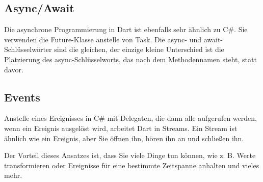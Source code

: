 \subsection{Async/Await}
Die asynchrone Programmierung in Dart ist ebenfalls sehr ähnlich zu C\#. Sie verwenden die Future-Klasse anstelle von Task. Die async- und await-Schlüsselwörter sind die gleichen, der einzige kleine Unterschied ist die Platzierung des async-Schlüsselworts, das nach dem Methodennamen steht, statt davor.

\begin{minipage}{\linewidth}

\end{minipage}


\subsection{Events}
Anstelle eines Ereignisses in C\# mit Delegaten, die dann alle aufgerufen werden, wenn ein Ereignis ausgelöst wird, arbeitet Dart in Streams. Ein Stream ist ähnlich wie ein Ereignis, aber Sie öffnen ihn, hören ihn an und schließen ihn.

Der Vorteil dieses Ansatzes ist, dass Sie viele Dinge tun können, wie z. B. Werte transformieren oder Ereignisse für eine bestimmte Zeitspanne anhalten und vieles mehr. 

\begin{minipage}{\linewidth}

\end{minipage}


